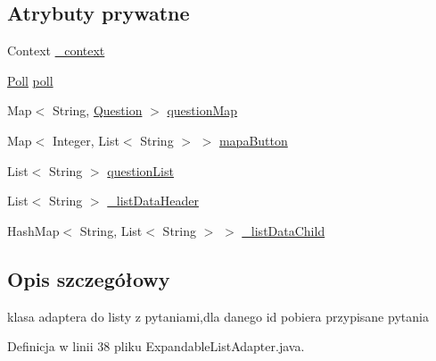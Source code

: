 \subsection*{Atrybuty prywatne}
\begin{DoxyCompactItemize}
\item 
Context \hyperlink{classcom_1_1example_1_1qrpoll_1_1_expandable_list_adapter_a7a712744eebf94bc189b44e5d04ff7da}{\+\_\+context}
\item 
\hyperlink{classcom_1_1example_1_1qrpoll_1_1_poll}{Poll} \hyperlink{classcom_1_1example_1_1qrpoll_1_1_expandable_list_adapter_a35f2a91149fc7265646cd916c54a02ef}{poll}
\item 
Map$<$ String, \hyperlink{classcom_1_1example_1_1qrpoll_1_1_question}{Question} $>$ \hyperlink{classcom_1_1example_1_1qrpoll_1_1_expandable_list_adapter_a5ec37e3c4af51739b2c0cd282b9bf208}{question\+Map}
\item 
Map$<$ Integer, List$<$ String $>$ $>$ \hyperlink{classcom_1_1example_1_1qrpoll_1_1_expandable_list_adapter_a8351d33fae079b02fb540090d49c6f2e}{mapa\+Button}
\item 
List$<$ String $>$ \hyperlink{classcom_1_1example_1_1qrpoll_1_1_expandable_list_adapter_a21519cda6be88f0b729afc1ac0cc06a5}{question\+List}
\item 
List$<$ String $>$ \hyperlink{classcom_1_1example_1_1qrpoll_1_1_expandable_list_adapter_a7290d1e184f1a8ef03ad8ea5bd4f273d}{\+\_\+list\+Data\+Header}
\item 
Hash\+Map$<$ String, List$<$ String $>$ $>$ \hyperlink{classcom_1_1example_1_1qrpoll_1_1_expandable_list_adapter_a9e3d05b47021b43ad465a1f7fa3d0ca2}{\+\_\+list\+Data\+Child}
\end{DoxyCompactItemize}


\subsection{Opis szczegółowy}
klasa adaptera do listy z pytaniami,dla danego id pobiera przypisane pytania 

Definicja w linii 38 pliku Expandable\+List\+Adapter.\+java.



